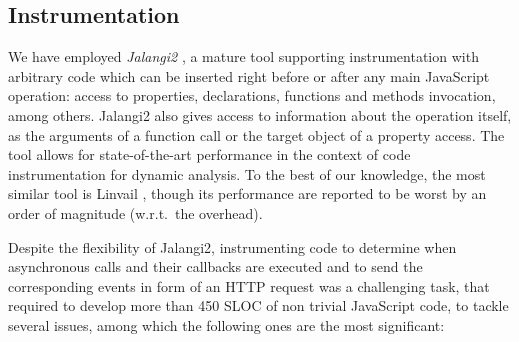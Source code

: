 \subsection{Instrumentation}
We have employed \emph{Jalangi2} \cite{jalangi}, a mature tool supporting instrumentation with
arbitrary code which can be inserted right before or after any main JavaScript operation: access to properties, declarations, functions and methods invocation, among others. Jalangi2 also gives access to information about the operation itself, as the arguments of a function call or the target object of a property access.
The tool allows for state-of-the-art performance in the context of code instrumentation for dynamic analysis.
To the best of our knowledge, the most similar tool is Linvail \cite{linvail}, though its performance are reported to be worst by an order of magnitude (w.r.t.\ the overhead).

Despite the flexibility of Jalangi2, instrumenting code to determine when asynchronous calls and their callbacks are executed and to send the corresponding events in form of an HTTP request was a challenging task, that required to develop more than 450 SLOC of non trivial JavaScript code, to tackle
several issues, among which the following ones are the most significant:

